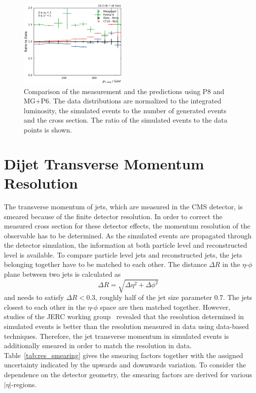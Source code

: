 \begin{figure}[htbp]
    \includegraphics[width=0.47\textwidth]{figures/measurement/ratio_reco_to_data_yb2ys0.pdf}
    \caption[Comparison of data with simulated events]{Comparison of the measurement and the predictions using P8 and MG+P6. The data distributions are normalized
    to the integrated luminosity, the simulated events to the number of generated events and the cross section. The ratio of the simulated
    events to the data points is shown.}
    \label{fig:ratio_recotodata}
\end{figure}


\section{Dijet Transverse Momentum  Resolution}
\label{sec:resolution}

The transverse momentum of jets, which are measured in the CMS detector, is
smeared because of the finite detector resolution. In order to correct the
measured cross section for these detector effects, the momentum resolution of
the observable has to be determined. As the simulated events are propagated
through the detector simulation, the information at both particle level and
reconstructed level is available. To compare particle level jets and
reconstructed jets, the jets belonging together have to be matched to each
other. The distance $\Delta R$ in the $\eta$-$\phi$ plane between two jets is
calculated as
%
\begin{equation}
\Delta R = \sqrt{\Delta \eta^2 + \Delta \phi^2}
\end{equation}
%
and needs to satisfy $\Delta R < 0.3$, roughly half of the jet size parameter
$0.7$. The jets closest to each other in the $\eta$-$\phi$ space are then matched together.
However, studies of the \textsc{JERC} working group~\cite{jetmet:resolution}
revealed that the resolution determined in simulated events is better than the
resolution measured in data using data-based techniques. Therefore, the jet
transverse momentum in simulated events is additionally smeared in order to
match the resolution in data.  Table~\ref{tab:res_smearing} gives the smearing
factors together with the assigned uncertainty indicated by the upwards and
downwards variation. To consider the dependence on the detector geometry, the
smearing factors are derived for various $|\eta|$-regions.

